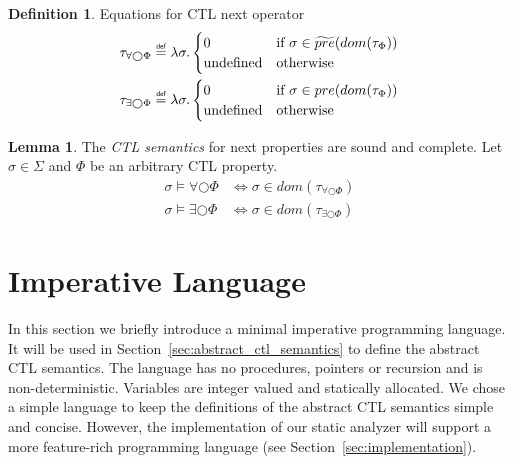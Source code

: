 \documentclass[11pt,a4paper,titlepage]{article}
\theoremstyle{definition}
\newtheorem{definition}{Definition}[section]
\newtheorem{lemma}[theorem]{Lemma}
\newcommand\eqdef{\mathrel{\overset{\makebox[0pt]{\mbox{\normalfont\tiny\sffamily def}}}{=}}}
\begin{document}
\begin{definition}\label{def:ctl_semantics_next}
    Equations for CTL next operator
    \setlength{\jot}{15pt}
    \begin{align}
        \tau_{\forall\bigcirc\Phi} &\eqdef \lambda \sigma.
        \begin{cases}
            0                   & \text{if} \ \sigma \in \widetilde{pre}(dom(\tau_\Phi)) \\
            \text{undefined}    & \text{otherwise}
        \end{cases}\\
        \tau_{\exists\bigcirc\Phi} &\eqdef \lambda \sigma.
        \begin{cases}
            0                   & \text{if} \ \sigma \in pre(dom(\tau_\Phi)) \\
            \text{undefined}    & \text{otherwise}
        \end{cases}
    \end{align}
\end{definition}

\begin{lemma}\label{lem:ctl_semantics_next}
    The \textit{CTL semantics} for \textsf{next} properties are sound and complete. 
    Let $\sigma \in \Sigma$ and $\Phi$ be an arbitrary CTL property.
    \begin{align}
        \sigma \models \forall\bigcirc\Phi &\iff \sigma \in dom(\tau_{\forall\bigcirc\Phi})\\
        \sigma \models \exists\bigcirc\Phi &\iff \sigma \in dom(\tau_{\exists\bigcirc\Phi})
    \end{align}
\end{lemma}


\section{Imperative Language}\label{sec:imperative_language}

In this section we briefly introduce a minimal imperative programming language. 
It will be used in Section~\ref{sec:abstract_ctl_semantics} to define the abstract CTL semantics.
The language has no procedures, pointers or recursion and is non-deterministic.
Variables are integer valued and statically allocated. We chose a simple language to 
keep the definitions of the abstract CTL semantics simple and concise. 
However, the implementation of our static analyzer 
will support a more feature-rich programming language (see Section~\ref{sec:implementation}).\\
\end{document}

